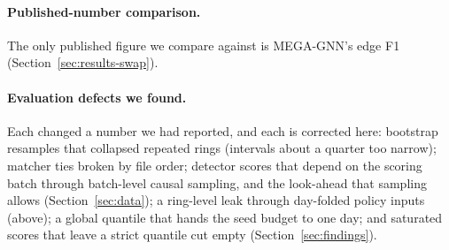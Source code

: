 \paragraph{Published-number comparison.}
The only published figure we compare against is MEGA-GNN's edge F1
(Section~\ref{sec:results-swap}).

\paragraph{Evaluation defects we found.}
Each changed a number we had reported, and each is corrected here: bootstrap resamples that
collapsed repeated rings (intervals about a quarter too narrow); matcher ties broken by file
order; detector scores that depend on the scoring batch through batch-level causal sampling, and
the look-ahead that sampling allows (Section~\ref{sec:data}); a ring-level leak through
day-folded policy inputs (above); a global quantile that hands the seed budget to one day; and
saturated scores that leave a strict quantile cut empty (Section~\ref{sec:findings}).
